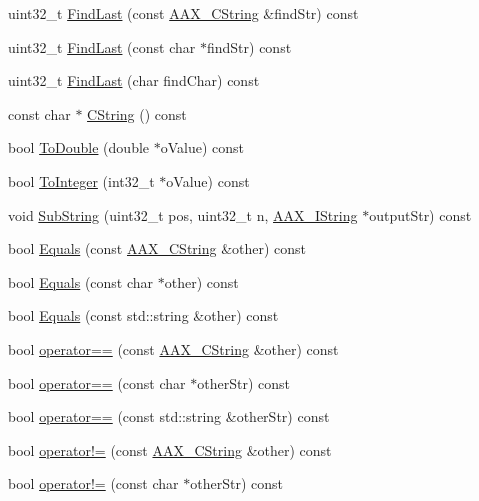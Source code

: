 \begin{DoxyCompactItemize}
\item 
uint32\+\_\+t \mbox{\hyperlink{a01573_abe6d77c979b5c96cee327fdae3231694}{Find\+Last}} (const \mbox{\hyperlink{a01573}{A\+A\+X\+\_\+\+C\+String}} \&find\+Str) const
\item 
uint32\+\_\+t \mbox{\hyperlink{a01573_aa0e71e9f1fcb2a22ad03fe87d48f3d0f}{Find\+Last}} (const char $\ast$find\+Str) const
\item 
uint32\+\_\+t \mbox{\hyperlink{a01573_a7be05cb2b2f1a67a598879c089aa2cbc}{Find\+Last}} (char find\+Char) const
\item 
const char $\ast$ \mbox{\hyperlink{a01573_a325db10aee379f7b23e44edcab47893b}{C\+String}} () const
\item 
bool \mbox{\hyperlink{a01573_a6dc9a81e486621fd5e3ea56df137f3d7}{To\+Double}} (double $\ast$o\+Value) const
\item 
bool \mbox{\hyperlink{a01573_a0bdbf112850d72fe372838e89a081d6d}{To\+Integer}} (int32\+\_\+t $\ast$o\+Value) const
\item 
void \mbox{\hyperlink{a01573_a35132df5b9f73bc2ddbfd673f4a5d22a}{Sub\+String}} (uint32\+\_\+t pos, uint32\+\_\+t n, \mbox{\hyperlink{a01873}{A\+A\+X\+\_\+\+I\+String}} $\ast$output\+Str) const
\item 
bool \mbox{\hyperlink{a01573_a842003a3cf6fb84be1f42160e87e0966}{Equals}} (const \mbox{\hyperlink{a01573}{A\+A\+X\+\_\+\+C\+String}} \&other) const
\item 
bool \mbox{\hyperlink{a01573_ac076376f56af764540c48c015f0f541a}{Equals}} (const char $\ast$other) const
\item 
bool \mbox{\hyperlink{a01573_af54d7f7faeab6cf63efb9239109d3390}{Equals}} (const std\+::string \&other) const
\item 
bool \mbox{\hyperlink{a01573_a6946cf59b5c5794234b2ea4a47b60b84}{operator==}} (const \mbox{\hyperlink{a01573}{A\+A\+X\+\_\+\+C\+String}} \&other) const
\item 
bool \mbox{\hyperlink{a01573_a76af1f25acabbe78a0cf56fe31c46edb}{operator==}} (const char $\ast$other\+Str) const
\item 
bool \mbox{\hyperlink{a01573_ad2d8d5ba1b4c09b6f1c262e4d8d5fb2c}{operator==}} (const std\+::string \&other\+Str) const
\item 
bool \mbox{\hyperlink{a01573_aceeeba7d93fd16a8d1296726950f3ead}{operator!=}} (const \mbox{\hyperlink{a01573}{A\+A\+X\+\_\+\+C\+String}} \&other) const
\item 
bool \mbox{\hyperlink{a01573_a6bd52b08f5895a320ef561117940f121}{operator!=}} (const char $\ast$other\+Str) const

\end{DoxyCompactItemize}
